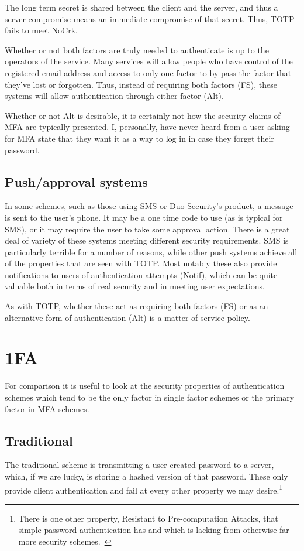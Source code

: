 \documentclass{soups}
\newcommand{\prop}[1]{\textsf{#1}}
\begin{document}
The long term secret is shared between the client and the server, and thus a server compromise means an immediate compromise of that secret. Thus, TOTP fails to meet \prop{NoCrk}.

Whether or not both factors are truly needed to authenticate is up to the operators of the service. Many services will allow people who have control of the registered email address and access to only one factor to by-pass the factor that they've lost or forgotten.
Thus, instead of requiring both factors (\prop{FS}), these systems will allow authentication through either factor (\prop{Alt}).

Whether or not \prop{Alt} is desirable, it is certainly not how the security claims of MFA are typically presented.
I, personally, have never heard from a user asking for MFA state that they want it as a way to log in in case they forget their password.

\subsection{Push/approval systems}\label{sec:push}

In some schemes, such as those using SMS or Duo Security's product,
a message is sent to the user's phone.
It may be a one time code to use (as is typical for SMS),
or it may require the user to take some approval action.
There is a great deal of variety of these systems
meeting different security requirements.
SMS is particularly terrible for a number of reasons, while other push systems achieve all of the properties that are seen with TOTP\@.
Most notably these also provide notifications to users of authentication
attempts (\prop{Notif}), which can be quite valuable both in terms of real security and in meeting user expectations.

As with TOTP, whether these act as requiring both factors (\prop{FS}) or as an alternative form of authentication (\prop{Alt}) is a matter of service policy.

\section{1FA}

For comparison it is useful to look at the security properties
of authentication schemes which tend to be the only factor in single
factor schemes or the primary factor in MFA schemes.

\subsection{Traditional}
The traditional scheme is transmitting a user created password to a server, which, if we are lucky, is storing a hashed version of that password. These only provide client authentication and fail at every other property we may desire.\footnote{There is one other property, Resistant to Pre-computation Attacks, that simple password authentication has and which is lacking from otherwise far more security schemes.~\autocite{JareckiETAL2018:OPAQUE}}
\end{document}
